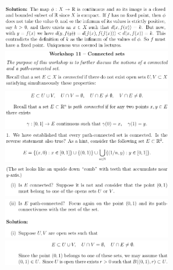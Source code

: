 \documentclass[8pt,landscape]{article}
\begin{document}
\begin{multicols}{3}
    \includegraphics[width=270]{133.png} \\
    \includegraphics[width=270]{134.png} \\
    \includegraphics[width=270]{135.png} \\
    \includegraphics[width=270]{136.png} \\
    \includegraphics[width=270]{137.png} \\
    \includegraphics[width=270]{138.png} \\
    \includegraphics[width=270]{139.png} \\

\end{multicols}
\end{document}

